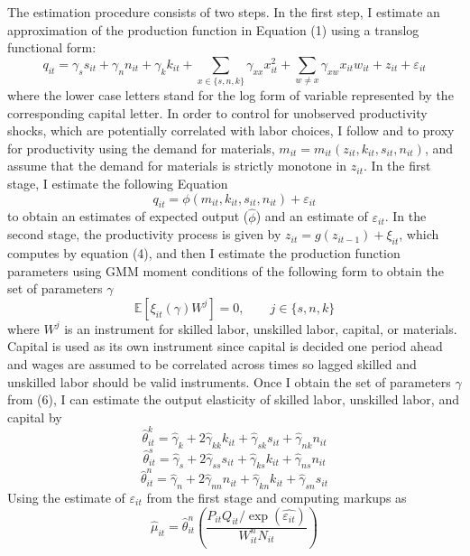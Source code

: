 \documentclass[12pt]{article}
\begin{document}
The estimation procedure consists of two steps. In the first step, I estimate an approximation of the production function in Equation (1) using a translog functional form:
\begin{equation}
    q_{it}=\gamma_{s}s_{it}+\gamma_{n}n_{it}+\gamma_{k}k_{it}+\sum_{x\in \{s,n,k\}}\gamma_{xx}x_{it}^{2}+\sum_{w\neq x}\gamma_{xw}x_{it}w_{it}+z_{it}+\varepsilon_{it}
\end{equation}
where the lower case letters stand for the log form of variable represented by the corresponding capital letter. In order to control for unobserved productivity shocks, which are potentially correlated with labor choices, I follow \citet{de2012markups} and \citet{de2017rise} to proxy for productivity using the demand for materials, $m_{it}=m_{it}(z_{it},k_{it},s_{it},n_{it})$, and assume that the demand for materials is strictly monotone in $z_{it}$. In the first stage, I estimate the following Equation
\begin{equation}
    q_{it}=\phi(m_{it},k_{it},s_{it},n_{it})+\varepsilon_{it}
\end{equation}
to obtain an estimates of expected output ($\hat{\phi}$) and an estimate of $\varepsilon_{it}$. In the second stage, the productivity process is given by $z_{it}=g(z_{it-1})+\xi_{it}$, which computes by equation (4), and then I estimate the production function parameters using GMM moment conditions of the following form to obtain the set of parameters $\gamma$
\begin{equation}
    \mathbb{E}[\xi_{it}(\gamma)W^{j}]=0, \qquad j\in\{s,n,k\}
\end{equation}
where $W^{j}$ is an instrument for skilled labor, unskilled labor, capital, or materials. Capital is used as its own instrument since capital is decided one period ahead and wages are assumed to be correlated across times so lagged skilled and unskilled labor should be valid instruments. Once I obtain the set of parameters $\gamma$ from (6), I can estimate the output elasticity of skilled labor, unskilled labor, and capital by
$$\hat{\theta}^{k}_{it}=\hat{\gamma}_{k}+2\hat{\gamma}_{kk}k_{it}+\hat{\gamma}_{sk}s_{it}+\hat{\gamma}_{nk}n_{it}$$
$$\hat{\theta}^{s}_{it}=\hat{\gamma}_{s}+2\hat{\gamma}_{ss}s_{it}+\hat{\gamma}_{ks}k_{it}+\hat{\gamma}_{ns}n_{it}$$
$$\hat{\theta}^{n}_{it}=\hat{\gamma}_{n}+2\hat{\gamma}_{nn}n_{it}+\hat{\gamma}_{kn}k_{it}+\hat{\gamma}_{sn}s_{it}$$
Using the estimate of $\varepsilon_{it}$ from the first stage and computing markups as
\begin{equation}
    \hat{\mu}_{it}=\hat{\theta}^{n}_{it} \left ( \frac{P_{it}Q_{it}/\exp(\hat{\varepsilon_{it}})}{W_{it}^{n}N_{it}} \right )
\end{equation}
\end{document}

